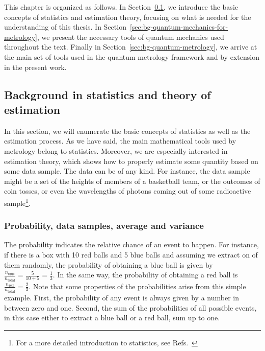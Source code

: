 This chapter is organized as follows.
In Section~\ref{sec:bg-statistics-and-stimation}, we introduce the basic concepts of statistics and estimation theory, focusing on what is needed for the understanding of this thesis.
In Section~\ref{sec:bg-quantum-mechanics-for-metrology}, we present the necessary tools of quantum mechanics used throughout the text.
Finally in Section~\ref{sec:bg-quantum-metrology}, we arrive at the main set of tools used in the quantum metrology framework and by extension in the present work.

\subsection{Background in statistics and theory of estimation}
\label{sec:bg-statistics-and-stimation}

In this section, we will enumerate the basic concepts of statistics as well as the estimation process.
As we have said, the main mathematical tools used by metrology belong to statistics.
Moreover, we are especially interested in estimation theory, which shows how to properly estimate some quantity based on some data sample.
The data can be of any kind.
For instance, the data sample might be a set of the heights of members of a basketball team, or the outcomes of coin tosses, or even the wavelengths of photons coming out of some radioactive sample\footnote{
For a more detailed introduction to statistics, see Refs.~\cite{Riley2006, Barlow1989}}.

\subsubsection{Probability, data samples, average and variance}

The probability indicates the relative chance of an event to happen.
For instance, if there is a box with 10 red balls and 5 blue balls and assuming we extract on of them randomly, the probability of obtaining a blue ball is given by $\frac{n_{\text{blue}}}{n_{\text{total}}}=\frac{5}{10+5}=\frac{1}{3}$.
In the same way, the probability of obtaining a red ball is $\frac{n_{\text{red}}}{n_{\text{total}}}=\frac{2}{3}$.
Note that some properties of the probabilities arise from this simple example.
First, the probability of any event is always given by a number in between zero and one.
Second, the sum of the probabilities of all possible events, in this case either to extract a blue ball or a red ball, sum up to one.

